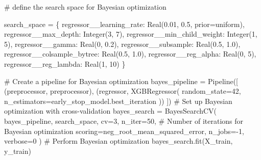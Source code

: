 \documentclass[
  letterpaper,
  DIV=11,
  numbers=noendperiod]{scrreprt}
\newenvironment{Shaded}{\begin{snugshade}}{\end{snugshade}}
\newcommand{\CommentTok}[1]{\textcolor[rgb]{0.37,0.37,0.37}{#1}}
\newcommand{\DecValTok}[1]{\textcolor[rgb]{0.68,0.00,0.00}{#1}}
\newcommand{\FloatTok}[1]{\textcolor[rgb]{0.68,0.00,0.00}{#1}}
\newcommand{\NormalTok}[1]{\textcolor[rgb]{0.00,0.23,0.31}{#1}}
\newcommand{\OperatorTok}[1]{\textcolor[rgb]{0.37,0.37,0.37}{#1}}
\newcommand{\StringTok}[1]{\textcolor[rgb]{0.13,0.47,0.30}{#1}}
\begin{document}
\begin{Shaded}
\begin{Highlighting}[]
\CommentTok{\# define the search space for Bayesian optimization}

\NormalTok{search\_space }\OperatorTok{=}\NormalTok{ \{}
    \StringTok{\textquotesingle{}regressor\_\_learning\_rate\textquotesingle{}}\NormalTok{: Real(}\FloatTok{0.01}\NormalTok{, }\FloatTok{0.5}\NormalTok{, prior}\OperatorTok{=}\StringTok{\textquotesingle{}uniform\textquotesingle{}}\NormalTok{),}
    \StringTok{\textquotesingle{}regressor\_\_max\_depth\textquotesingle{}}\NormalTok{: Integer(}\DecValTok{3}\NormalTok{, }\DecValTok{7}\NormalTok{),}
    \StringTok{\textquotesingle{}regressor\_\_min\_child\_weight\textquotesingle{}}\NormalTok{: Integer(}\DecValTok{1}\NormalTok{, }\DecValTok{5}\NormalTok{),}
    \StringTok{\textquotesingle{}regressor\_\_gamma\textquotesingle{}}\NormalTok{: Real(}\DecValTok{0}\NormalTok{, }\FloatTok{0.2}\NormalTok{),}
    \StringTok{\textquotesingle{}regressor\_\_subsample\textquotesingle{}}\NormalTok{: Real(}\FloatTok{0.5}\NormalTok{, }\FloatTok{1.0}\NormalTok{),}
    \StringTok{\textquotesingle{}regressor\_\_colsample\_bytree\textquotesingle{}}\NormalTok{: Real(}\FloatTok{0.5}\NormalTok{, }\FloatTok{1.0}\NormalTok{),}
    \StringTok{\textquotesingle{}regressor\_\_reg\_alpha\textquotesingle{}}\NormalTok{: Real(}\DecValTok{0}\NormalTok{, }\DecValTok{5}\NormalTok{),}
    \StringTok{\textquotesingle{}regressor\_\_reg\_lambda\textquotesingle{}}\NormalTok{: Real(}\DecValTok{1}\NormalTok{, }\DecValTok{10}\NormalTok{)}
\NormalTok{\}}

\CommentTok{\# Create a pipeline for Bayesian optimization}
\NormalTok{bayes\_pipeline }\OperatorTok{=}\NormalTok{ Pipeline([}
\NormalTok{    (}\StringTok{\textquotesingle{}preprocessor\textquotesingle{}}\NormalTok{, preprocessor),}
\NormalTok{    (}\StringTok{\textquotesingle{}regressor\textquotesingle{}}\NormalTok{, XGBRegressor(}
\NormalTok{        random\_state}\OperatorTok{=}\DecValTok{42}\NormalTok{,}
\NormalTok{        n\_estimators}\OperatorTok{=}\NormalTok{early\_stop\_model.best\_iteration}
\NormalTok{    ))}
\NormalTok{])}
\CommentTok{\# Set up Bayesian optimization with cross{-}validation}
\NormalTok{bayes\_search }\OperatorTok{=}\NormalTok{ BayesSearchCV(}
\NormalTok{    bayes\_pipeline,}
\NormalTok{    search\_space,}
\NormalTok{    cv}\OperatorTok{=}\DecValTok{3}\NormalTok{,}
\NormalTok{    n\_iter}\OperatorTok{=}\DecValTok{50}\NormalTok{,  }\CommentTok{\# Number of iterations for Bayesian optimization}
\NormalTok{    scoring}\OperatorTok{=}\StringTok{\textquotesingle{}neg\_root\_mean\_squared\_error\textquotesingle{}}\NormalTok{,}
\NormalTok{    n\_jobs}\OperatorTok{={-}}\DecValTok{1}\NormalTok{,}
\NormalTok{    verbose}\OperatorTok{=}\DecValTok{0}
\NormalTok{)}
\CommentTok{\# Perform Bayesian optimization}
\NormalTok{bayes\_search.fit(X\_train, y\_train)}


\end{Highlighting}
\end{Shaded}
\end{document}
